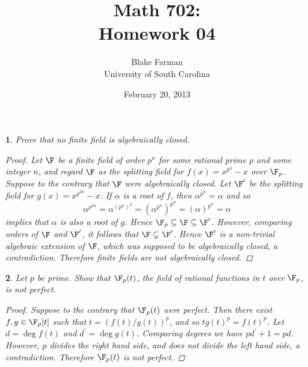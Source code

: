 \documentclass[10pt]{amsart}
\author{Blake Farman\\University of South Carolina}
\title{Math 702:\\Homework 04}
\date{February 20, 2013}
\begin{document}
\maketitle

\providecommand{\p}{\mathfrak{p}}
\providecommand{\m}{\mathfrak{m}}

\newtheorem{thm}{}
\newtheorem{lem}{Lemma}

\newcommand{\End}[2]{\operatorname{End}_{#1}\left(#2\right)}
\newcommand{\Hom}[2]{\operatorname{Hom}_{#1}\left(#2\right)}

\begin{thm}
  Prove that no finite field is algebraically closed.
  \begin{proof}
    Let $\F$ be a finite field of order $p^n$ for some rational prime $p$ and some integer $n$, and regard $\F$ as the splitting field for $f(x) = x^{p^n} - x$ over $\F_p$.
    Suppose to the contrary that $\F$ were algebraically closed.
    Let $\F^\prime$ be the splitting field for $g(x) = x^{p^{2n}} - x$.
    If $\alpha$ is a root of $f$, then $\alpha^{p^n} = \alpha$ and so
    $$\alpha^{p^{2n}} = \alpha^{(p^n)^2} = \left(\alpha^{p^n}\right)^{p^n} = (\alpha)^{p^n} = \alpha$$ 
    implies that $\alpha$ is also a root of $g$.
    Hence $\F_p \subseteq \F \subseteq \F^\prime$.
    However, comparing orders of $\F$ and $\F^\prime$, it follows that $\F \subsetneq \F^\prime$.
    Hence $\F^\prime$ is a non-trivial algebraic extension of $\F$, which was supposed to be algebraically closed, a contradiction.
    Therefore finite fields are not algebraically closed.
  \end{proof}
\end{thm}

\begin{thm}
  Let $p$ be prime.
  Show that $\F_p(t)$, the field of rational functions in $t$ over $\F_p$, is not perfect.
  \begin{proof}
    Suppose to the contrary that $\F_p(t)$ were perfect.
    Then there exist $f, g \in \F_p[t]$ such that $t = (f(t)/g(t))^p$, and so $tg(t)^p = f(t)^p$.
    Let $d = \deg{f(t)}$ and $d^\prime = \deg{g(t)}$.
    Comparing degrees we have $pd^\prime + 1 = pd$.
    However, $p$ divides the right hand side, and does not divide the left hand side, a contradiction.
    Therefore $\F_p(t)$ is not perfect.
  \end{proof}
\end{thm}
\end{document}
